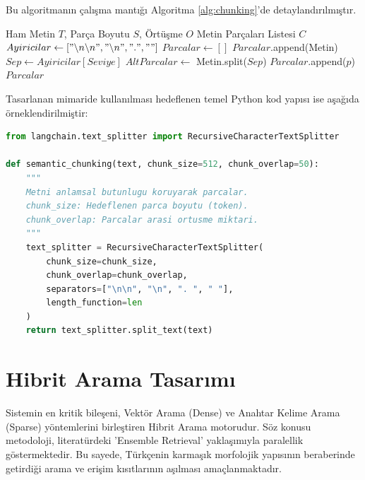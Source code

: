 \documentclass[12pt,a4paper]{report}
\begin{document}
Bu algoritmanın çalışma mantığı Algoritma \ref{alg:chunking}'de detaylandırılmıştır.

\begin{algorithm}
\caption{Rekürsif Anlamsal Parçalama Algoritması}
\label{alg:chunking}
\begin{algorithmic}[1]
\Require Ham Metin $T$, Parça Boyutu $S$, Örtüşme $O$
\Ensure Metin Parçaları Listesi $C$
\State $Ayiricilar \gets ["\backslash n\backslash n", "\backslash n", ". ", " "]$ 
\State $Parcalar \gets []$
        \State $Parcalar$.append(Metin)
        \State \Return
    \EndIf
    \State $Sep \gets Ayiricilar[Seviye]$
    \State $AltParcalar \gets$ Metin.split($Sep$)
            \State {}
        \Else
            \State $Parcalar$.append($p$)
        \EndIf
    \EndFor
\EndFunction
\State {}
\State \Return $Parcalar$
\end{algorithmic}
\end{algorithm}

Tasarlanan mimaride kullanılması hedeflenen temel Python kod yapısı ise aşağıda örneklendirilmiştir:

\begin{lstlisting}[language=Python, caption=Anlamsal Parçalama için Öngörülen Kod Yapısı]
from langchain.text_splitter import RecursiveCharacterTextSplitter

def semantic_chunking(text, chunk_size=512, chunk_overlap=50):
    """
    Metni anlamsal butunlugu koruyarak parcalar.
    chunk_size: Hedeflenen parca boyutu (token).
    chunk_overlap: Parcalar arasi ortusme miktari.
    """
    text_splitter = RecursiveCharacterTextSplitter(
        chunk_size=chunk_size,
        chunk_overlap=chunk_overlap,
        separators=["\n\n", "\n", ". ", " "],
        length_function=len
    )
    return text_splitter.split_text(text)
\end{lstlisting}

\section{Hibrit Arama Tasarımı}
Sistemin en kritik bileşeni, Vektör Arama (Dense) ve Anahtar Kelime Arama (Sparse) yöntemlerini birleştiren Hibrit Arama motorudur. Söz konusu metodoloji, literatürdeki 'Ensemble Retrieval' yaklaşımıyla paralellik göstermektedir. Bu sayede, Türkçenin karmaşık morfolojik yapısının beraberinde getirdiği arama ve erişim kısıtlarının aşılması amaçlanmaktadır.
\end{document}
